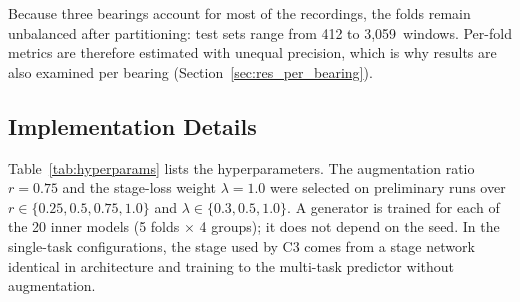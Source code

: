 \documentclass[review]{elsarticle}
\begin{document}
Because three bearings account for most of the recordings, the folds
remain unbalanced after partitioning: test sets range from 412 to
3,059~windows. Per-fold metrics are therefore estimated with unequal
precision, which is why results are also examined per bearing
(Section~\ref{sec:res_per_bearing}).

\subsection{Implementation Details}
\label{sec:implementation}

Table~\ref{tab:hyperparams} lists the hyperparameters. The augmentation
ratio $r = 0.75$ and the stage-loss weight $\lambda = 1.0$ were
selected on preliminary runs over $r \in \{0.25, 0.5, 0.75, 1.0\}$ and
$\lambda \in \{0.3, 0.5, 1.0\}$. A generator is trained for each of the
20 inner models (5 folds $\times$ 4 groups); it does not depend on the
seed. In the single-task configurations, the stage used by C3 comes
from a stage network identical in architecture and training to the
multi-task predictor without augmentation.
\end{document}

